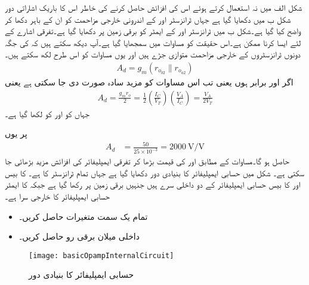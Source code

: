 شکل  الف میں  نہ استعمال کرتے ہوئے اس کی افزائش حاصل کرنے کی خاطر اس کا باریک اشاراتی دور شکل  ب میں دکھایا گیا ہے جہاں ٹرانزسٹر   اور  کے اندرونی خارجی مزاحمت  کو ان کے باہر دکھا کر واضح کیا گیا ہے۔شکل  ب میں ٹرانزسٹر  اور  کے ایمٹر کو برقی زمین پر دکھایا گیا ہے۔تفرقی اشارے کے لئے ایسا کرنا ممکن ہے۔اس حقیقت کو مساوات  میں سمجھایا گیا ہے۔آپ دیکھ سکتے ہیں کہ  کی جگہ دونوں ٹرانزسٹروں کے خارجی مزاحمت متوازی جڑے ہیں اور یوں مساوات    کو اس طرح لکھ سکتے ہیں۔
\begin{align} \label{مساوات_تفرقی_ٹرانزسٹر_لدھا_بڑھاتی_الف}
A_d=g_m \left( r_{o_{b2}} \parallel r_{o_{a2}} \right )
\end{align}
اگر  اور  برابر ہوں یعنی    تب اس مساوات کو مزید سادہ صورت دی جا سکتی ہے یعنی
\begin{align}\label{مساوات_تفرقی_سادہ_ترین_کی_افزائش}
A_d=\frac{g_m r_o}{2}=\frac{1}{2} \left(\frac{I_C}{V_T} \right ) \left(\frac{V_A}{I_C} \right )=\frac{V_A}{2 V_T}
\end{align}
جہاں   کو  اور   کو  لکھا گیا ہے۔

 پر یوں 
\begin{align*}
A_d&=\frac{50}{25 \times 10^{-3}}=\SI{2000}{\volt \per \volt}
\end{align*}
حاصل ہو گا۔مساوات   کے مطابق  اور   کی قیمت بڑھا کر تفرقی ایمپلیفائر کی افزائش مزید بڑھائی جا سکتی ہے۔
شکل  میں حسابی ایمپلیفائر کا بنیادی دور دکھایا گیا ہے جہاں تمام ٹرانزسٹر کا  ہے۔ کا بیس  اور  کا بیس حسابی ایمپلیفائر کے دو داخلی سرے ہیں جنہیں برقی زمین پر رکھا گیا ہے جبکہ  کا ایمٹر حسابی ایمپلیفائر کا خارجی سرا ہے۔
\begin{itemize}
\item
تمام یک سمت متغیرات حاصل کریں۔
\item
داخلی میلان برقی رو  حاصل کریں۔
\end{itemize}

\begin{figure}
\centering
\texttt{[image: basicOpampInternalCircuit]}
\caption{حسابی ایمپلیفائر کا بنیادی دور}
\label{شکل_تفرقی_حسابی_ایمپلیفائر_بنیادی_دور}
\end{figure}

